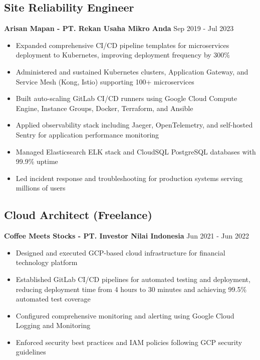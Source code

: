 \documentclass[11pt,a4paper]{article}
\newcommand{\company}[1]{\textbf{\color{primary}#1}}
\newcommand{\daterange}[1]{\color{secondary}#1}  %
\begin{document}
\subsection{Site Reliability Engineer}
\company{Arisan Mapan - PT. Rekan Usaha Mikro Anda} \hfill \daterange{Sep 2019 - Jul 2023}
\begin{itemize}[leftmargin=*, itemsep=2pt]
            \item Expanded comprehensive CI/CD pipeline templates for microservices deployment to Kubernetes, improving deployment frequency by 300\%
            \item Administered and sustained Kubernetes clusters, Application Gateway, and Service Mesh (Kong, Istio) supporting 100+ microservices
    \item Built auto-scaling GitLab CI/CD runners using Google Cloud Compute Engine, Instance Groups, Docker, Terraform, and Ansible
            \item Applied observability stack including Jaeger, OpenTelemetry, and self-hosted Sentry for application performance monitoring
    \item Managed Elasticsearch ELK stack and CloudSQL PostgreSQL databases with 99.9\% uptime
    \item Led incident response and troubleshooting for production systems serving millions of users
\end{itemize}

\subsection{Cloud Architect (Freelance)}
\company{Coffee Meets Stocks - PT. Investor Nilai Indonesia} \hfill \daterange{Jun 2021 - Jun 2022}
\begin{itemize}[leftmargin=*, itemsep=2pt]
            \item Designed and executed GCP-based cloud infrastructure for financial technology platform
            \item Established GitLab CI/CD pipelines for automated testing and deployment, reducing deployment time from 4 hours to 30 minutes and achieving 99.5\% automated test coverage
    \item Configured comprehensive monitoring and alerting using Google Cloud Logging and Monitoring
            \item Enforced security best practices and IAM policies following GCP security guidelines
\end{itemize}
\end{document}

